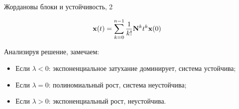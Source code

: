 \documentclass{beamer}
\begin{document}
\begin{frame}{Жордановы блоки и устойчивость, 2}
	\begin{flushleft}
		
		\begin{align}
			\mathbf{x} (t)=  \sum_{k=0}^{n-1} \frac{1}{k!} \mathbf{N}^k t^k \mathbf{x} (0)
		\end{align}
		
		Анализируя решение, замечаем:
		
		\begin{itemize}
			\item Если $\lambda < 0$: экспоненциальное затухание доминирует, система устойчива;
			\item Если $\lambda = 0$: полиномиальный рост, система неустойчива;
			\item Если $\lambda > 0$: экспоненциальный рост, неустойчива.
		\end{itemize}
		
	\end{flushleft}
\end{frame}
\end{document}
